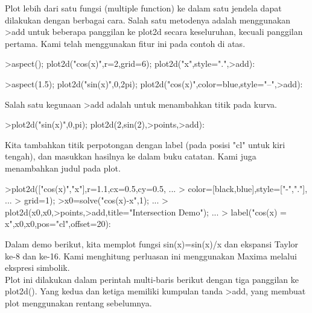 \documentclass[a4paper,10pt]{article}
\begin{document}
\begin{eulernotebook}
\begin{eulercomment}
\begin{eulercomment}
\begin{eulercomment}
\begin{eulercomment}
\begin{eulercomment}
\begin{eulercomment}
\begin{eulercomment}
Plot lebih dari satu fungsi (multiple function) ke dalam satu jendela
dapat dilakukan dengan berbagai cara. Salah satu metodenya adalah
menggunakan \textgreater{}add untuk beberapa panggilan ke plot2d secara
keseluruhan, kecuali panggilan pertama. Kami telah menggunakan fitur
ini pada contoh di atas.
\end{eulercomment}
\begin{eulerprompt}
>aspect(); plot2d("cos(x)",r=2,grid=6); plot2d("x",style=".",>add):
\end{eulerprompt}
\begin{eulerprompt}
>aspect(1.5); plot2d("sin(x)",0,2pi); plot2d("cos(x)",color=blue,style="--",>add):
\end{eulerprompt}
\begin{eulercomment}
Salah satu kegunaan \textgreater{}add adalah untuk menambahkan titik pada kurva.
\end{eulercomment}
\begin{eulerprompt}
>plot2d("sin(x)",0,pi); plot2d(2,sin(2),>points,>add):
\end{eulerprompt}
\begin{eulercomment}
Kita tambahkan titik perpotongan dengan label (pada posisi "cl" untuk
kiri tengah), dan masukkan hasilnya ke dalam buku catatan. Kami juga
menambahkan judul pada plot.
\end{eulercomment}
\begin{eulerprompt}
>plot2d(["cos(x)","x"],r=1.1,cx=0.5,cy=0.5, ...
>  color=[black,blue],style=["-","."], ...
>  grid=1);
>x0=solve("cos(x)-x",1);  ...
>  plot2d(x0,x0,>points,>add,title="Intersection Demo");  ...
>  label("cos(x) = x",x0,x0,pos="cl",offset=20):
\end{eulerprompt}
\begin{eulercomment}
Dalam demo berikut, kita memplot fungsi sin(x)=sin(x)/x dan ekspansi
Taylor ke-8 dan ke-16. Kami menghitung perluasan ini menggunakan
Maxima melalui ekspresi simbolik.\\
Plot ini dilakukan dalam perintah multi-baris berikut dengan tiga
panggilan ke plot2d(). Yang kedua dan ketiga memiliki kumpulan tanda
\textgreater{}add, yang membuat plot menggunakan rentang sebelumnya.


\end{eulercomment}
\end{eulercomment}
\end{eulercomment}
\end{eulercomment}
\end{eulercomment}
\end{eulercomment}
\end{eulercomment}
\end{eulernotebook}
\end{document}
